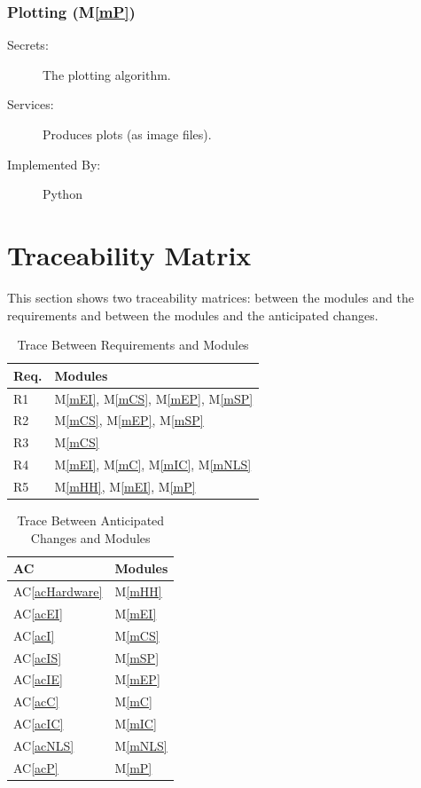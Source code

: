 \documentclass[12pt, titlepage]{article}
\newcommand{\acref}[1]{AC\ref{#1}}
\newcommand{\mref}[1]{M\ref{#1}}
\begin{document}
\subsubsection{Plotting (\mref{mP})}

\begin{description}
\item[Secrets:] The plotting algorithm.
\item[Services:] Produces plots (as image files). 
\item[Implemented By:] Python
\end{description}

\newpage
\section{Traceability Matrix} \label{SecTM}

This section shows two traceability matrices: between the modules and the
requirements and between the modules and the anticipated changes.

\begin{table}[H]
\centering
\begin{tabular}{p{} p{}}
\toprule
\textbf{Req.} & \textbf{Modules}\\
\midrule
R1 & \mref{mEI}, \mref{mCS}, \mref{mEP}, \mref{mSP}\\
R2 & \mref{mCS}, \mref{mEP}, \mref{mSP}\\
R3 & \mref{mCS}\\
R4 & \mref{mEI}, \mref{mC}, \mref{mIC}, \mref{mNLS}\\
R5 & \mref{mHH}, \mref{mEI}, \mref{mP}\\
\bottomrule
\end{tabular}
\caption{Trace Between Requirements and Modules}
\label{TblRT}
\end{table}

\begin{table}[H]
\centering
\begin{tabular}{p{} p{}}
\toprule
\textbf{AC} & \textbf{Modules}\\
\midrule
\acref{acHardware} & \mref{mHH}\\
\acref{acEI} & \mref{mEI}\\
\acref{acI} & \mref{mCS}\\
\acref{acIS} & \mref{mSP}\\
\acref{acIE} & \mref{mEP}\\
\acref{acC} & \mref{mC}\\
\acref{acIC} & \mref{mIC}\\
\acref{acNLS} & \mref{mNLS}\\
\acref{acP} & \mref{mP}\\
\bottomrule
\end{tabular}
\caption{Trace Between Anticipated Changes and Modules}
\label{TblACT}
\end{table}
\end{document}
